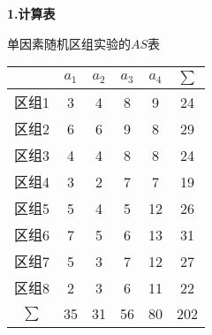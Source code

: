 \textbf{1.计算表}
\begin{margintable}
	\centering
	\caption{单因素随机区组实验的$AS$表}
	{
		\begin{tabular}{ccccc|c}
			\toprule
    			 & $a_1$ &  $a_2$ &  $a_3$ &  $a_4$ & $\sum$ \\
    			     \midrule
                        区组1 & \cellcolor[rgb]{ .949,  .949,  .949}3 & \cellcolor[rgb]{ .949,  .949,  .949}4 & \cellcolor[rgb]{ .949,  .949,  .949}8 & \cellcolor[rgb]{ .949,  .949,  .949}9 & \cellcolor[rgb]{ .988,  .894,  .839}24 \\
                        区组2 & \cellcolor[rgb]{ .949,  .949,  .949}6 & \cellcolor[rgb]{ .949,  .949,  .949}6 & \cellcolor[rgb]{ .949,  .949,  .949}9 & \cellcolor[rgb]{ .949,  .949,  .949}8 & \cellcolor[rgb]{ .988,  .894,  .839}29 \\
                        区组3 & \cellcolor[rgb]{ .949,  .949,  .949}4 & \cellcolor[rgb]{ .949,  .949,  .949}4 & \cellcolor[rgb]{ .949,  .949,  .949}8 & \cellcolor[rgb]{ .949,  .949,  .949}8 & \cellcolor[rgb]{ .988,  .894,  .839}24 \\
                        区组4 & \cellcolor[rgb]{ .949,  .949,  .949}3 & \cellcolor[rgb]{ .949,  .949,  .949}2 & \cellcolor[rgb]{ .949,  .949,  .949}7 & \cellcolor[rgb]{ .949,  .949,  .949}7 & \cellcolor[rgb]{ .988,  .894,  .839}19 \\
                        区组5 & \cellcolor[rgb]{ .949,  .949,  .949}5 & \cellcolor[rgb]{ .949,  .949,  .949}4 & \cellcolor[rgb]{ .949,  .949,  .949}5 & \cellcolor[rgb]{ .949,  .949,  .949}12 & \cellcolor[rgb]{ .988,  .894,  .839}26 \\
                        区组6 & \cellcolor[rgb]{ .949,  .949,  .949}7 & \cellcolor[rgb]{ .949,  .949,  .949}5 & \cellcolor[rgb]{ .949,  .949,  .949}6 & \cellcolor[rgb]{ .949,  .949,  .949}13 & \cellcolor[rgb]{ .988,  .894,  .839}31 \\
                        区组7 & \cellcolor[rgb]{ .949,  .949,  .949}5 & \cellcolor[rgb]{ .949,  .949,  .949}3 & \cellcolor[rgb]{ .949,  .949,  .949}7 & \cellcolor[rgb]{ .949,  .949,  .949}12 & \cellcolor[rgb]{ .988,  .894,  .839}27 \\
                        区组8 & \cellcolor[rgb]{ .949,  .949,  .949}2 & \cellcolor[rgb]{ .949,  .949,  .949}3 & \cellcolor[rgb]{ .949,  .949,  .949}6 & \cellcolor[rgb]{ .949,  .949,  .949}11 & \cellcolor[rgb]{ .988,  .894,  .839}22 \\
                        \midrule
                              $\sum$ & \cellcolor[rgb]{ .886,  .937,  .855}35 & \cellcolor[rgb]{ .886,  .937,  .855}31 & \cellcolor[rgb]{ .886,  .937,  .855}56 & \cellcolor[rgb]{ .886,  .937,  .855}80 & \cellcolor[rgb]{ .867,  .922,  .969}202 \\

			\bottomrule
		\end{tabular}
	}
\end{margintable}
